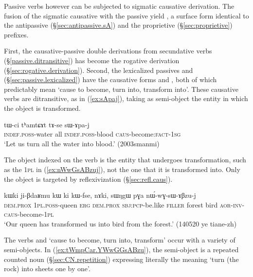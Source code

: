 Passive verbs however can be subjected to sigmatic causative derivation. The fusion of the sigmatic causative  with the passive  yield , a surface form identical to the antipassive (§\ref{sec:antipassive.sA}) and the proprietive (§\ref{sec:proprietive}) prefixes.
 
First, the causative-passive double derivations from secundative verbs (§\ref{passive.ditransitive}) has become the rogative derivation (§\ref{sec:rogative.derivation}).  Second, the lexicalized passives  and  (§\ref{sec:passive.lexicalized}) have the causative forms  and , both of which predictably mean `cause to become, turn into, transform into'. These causative verbs are ditransitive, as in (\ref{ex:sApaj}), taking as semi-object the entity in which the object is transformed.

\begin{exe}
\ex \label{ex:sApaj}
\gll tɯ-ci tʰamtɕɤt tɤ-se sɯ-ɤpa-j \\
\textsc{indef}.\textsc{poss}-water all \textsc{indef}.\textsc{poss}-blood \textsc{caus}-become:\textsc{fact}-\textsc{1sg} \\
\glt `Let us turn all the water into blood.' (2003smanmi)
\end{exe} 

The object indexed on the verb is the entity that undergoes transformation, such as the \textsc{1pl} in (\ref{ex:nWwGsABzuj}), not the one that it is transformed into. Only the object is targeted by reflexivization (§\ref{sec:refl.caus}). 

\begin{exe}
\ex \label{ex:nWwGsABzuj}
\gll kɯki ji-βdaʁmu kɯ ki kɯ-fse, nɤki, sɯŋgɯ pɣa nɯ́-wɣ-sɯ-ɤβzu-j \\
\textsc{dem}.\textsc{prox} \textsc{1pl}.\textsc{poss}-queen \textsc{erg} \textsc{dem}.\textsc{prox} \textsc{sbj}:\textsc{pcp}-be.like \textsc{filler} forest bird \textsc{aor}-\textsc{inv}-\textsc{caus}-become-\textsc{1pl} \\
\glt `Our queen has transformed us into bird from the forest.' (140520 ye tiane-zh)
\end{exe} 

The verbs  and  `cause to become, turn into, transform' occur with a variety of semi-objects. In (\ref{ex:tWmpCar.YWwGGsABzu}), the semi-object  is a repeated counted noun (§\ref{sec:CN.repetition}) expressing literally the meaning `turn (the rock) into sheets one by one'. 

